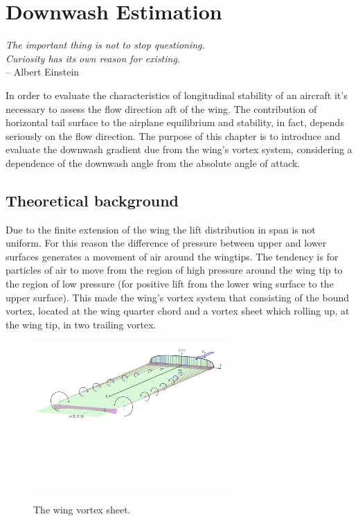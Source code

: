 \chapter{Downwash Estimation}
\label{ch:workobject}

\begin{flushright}
	{\smaller
		\textit{The important thing is not to stop questioning.\\  Curiosity has its own reason for existing.}\\
		-- Albert Einstein}
\end{flushright}

In order to evaluate the characteristics of longitudinal stability of an aircraft it's necessary to assess the flow direction aft of the wing. The contribution of horizontal tail surface to the airplane equilibrium and stability, in fact, depends seriously on the flow direction. The purpose of this chapter is to introduce and evaluate the downwash gradient due from the wing's vortex system, considering a dependence of the downwash angle from the absolute angle of attack. 

\section{Theoretical background}

Due to the finite extension of the wing the lift distribution in span is not uniform. For this reason the difference of pressure between upper and lower surfaces generates a movement of air around the wingtips. The tendency is for particles of air to move from the region of high pressure around the wing tip to the region of low pressure (for positive lift from the lower wing surface to the upper surface). This made the wing's vortex system that consisting of the bound vortex, located at the wing quarter chord and a vortex sheet which rolling up, at the wing tip, in two trailing vortex.\cite{PerkinsHage} \cite{Jacobs:NACA:Rep:648} \\ 


\begin{figure}[H]
\centering
{\includegraphics[height=5.7cm]{Immagini/wing_vortex_sheet3.pdf}} 
\caption{The wing vortex sheet.}
\end{figure}

